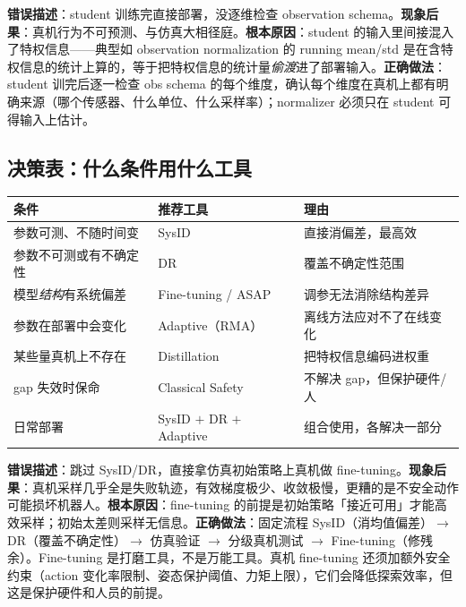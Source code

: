 \begin{pitfall}
\textbf{错误描述}：student 训练完直接部署，没逐维检查 observation schema。\textbf{现象后果}：真机行为不可预测、与仿真大相径庭。\textbf{根本原因}：student 的输入里间接混入了特权信息——典型如 observation normalization 的 running mean/std 是在含特权信息的统计上算的，等于把特权信息的统计量\emph{偷渡}进了部署输入。\textbf{正确做法}：student 训完后逐一检查 obs schema 的每个维度，确认每个维度在真机上都有明确来源（哪个传感器、什么单位、什么采样率）；normalizer 必须只在 student 可得输入上估计。
\end{pitfall}

\subsection{决策表：什么条件用什么工具}
\label{sec:rlmc-s2r-decision}

\begin{center}
\small
\begin{tabular}{@{}p{4.6cm}p{2.6cm}p{4.4cm}@{}}
\toprule
条件 & 推荐工具 & 理由 \\
\midrule
参数可测、不随时间变 & SysID & 直接消偏差，最高效 \\
参数不可测或有不确定性 & DR & 覆盖不确定性范围 \\
模型\emph{结构}有系统偏差 & Fine-tuning / ASAP & 调参无法消除结构差异 \\
参数在部署中会变化 & Adaptive（RMA） & 离线方法应对不了在线变化 \\
某些量真机上不存在 & Distillation & 把特权信息编码进权重 \\
gap 失效时保命 & Classical Safety & 不解决 gap，但保护硬件/人 \\
日常部署 & SysID $+$ DR $+$ Adaptive & 组合使用，各解决一部分 \\
\bottomrule
\end{tabular}
\end{center}

\begin{pitfall}
\textbf{错误描述}：跳过 SysID/DR，直接拿仿真初始策略上真机做 fine-tuning。\textbf{现象后果}：真机采样几乎全是失败轨迹，有效梯度极少、收敛极慢，更糟的是不安全动作可能损坏机器人。\textbf{根本原因}：fine-tuning 的前提是初始策略「接近可用」才能高效采样；初始太差则采样无信息。\textbf{正确做法}：固定流程 SysID（消均值偏差）$\to$ DR（覆盖不确定性）$\to$ 仿真验证 $\to$ 分级真机测试 $\to$ Fine-tuning（修残余）。Fine-tuning 是打磨工具，不是万能工具。真机 fine-tuning 还须加额外安全约束（action 变化率限制、姿态保护阈值、力矩上限），它们会降低探索效率，但这是保护硬件和人员的前提。
\end{pitfall}

